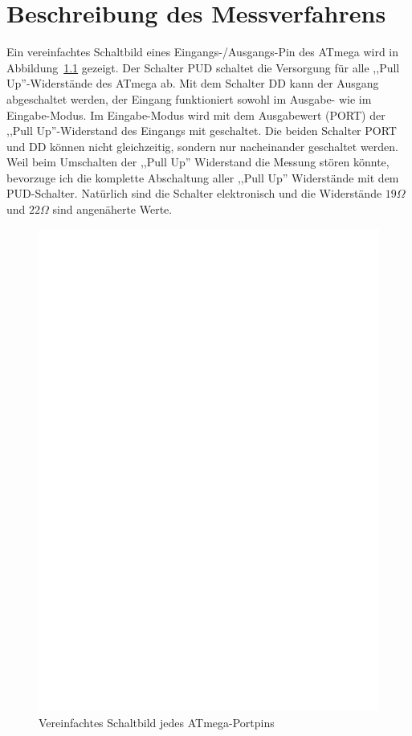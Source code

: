\chapter{Beschreibung des Messverfahrens}
\label{sec:measurement}
Ein vereinfachtes Schaltbild eines Eingangs-/Ausgangs-Pin des ATmega wird in Abbildung~\ref{fig:port} gezeigt.
Der Schalter PUD schaltet die Versorgung für alle ,,Pull Up''-Widerstände des ATmega ab.
Mit dem Schalter DD kann der Ausgang abgeschaltet werden, der Eingang funktioniert sowohl im Ausgabe- wie im
Eingabe-Modus. Im Eingabe-Modus wird mit dem Ausgabewert (PORT) der ,,Pull Up''-Widerstand des Eingangs mit geschaltet.
Die beiden Schalter PORT und DD können nicht gleichzeitig, sondern nur nacheinander geschaltet werden.
Weil beim Umschalten der ,,Pull Up'' Widerstand die Messung stören könnte, bevorzuge ich die komplette
Abschaltung aller ,,Pull Up'' Widerstände mit dem PUD-Schalter.
Natürlich sind die Schalter elektronisch und die Widerstände \(19\Omega\) und \(22\Omega\) sind angenäherte Werte.
\begin{figure}[H]
\centering
\includegraphics[]{../FIG/port.eps}
\caption{Vereinfachtes Schaltbild jedes ATmega-Portpins}
\label{fig:port}
\end{figure}


